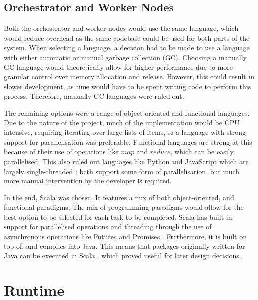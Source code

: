 \subsection{Orchestrator and Worker Nodes}
Both the orchestrator and worker nodes would use the same language, which would reduce overhead as the same codebase could be used for both parts of the system. When selecting a language, a decision had to be made to use a language with either automatic or manual garbage collection (GC). Choosing a manually GC language would theoretically allow for higher  performance due to more granular control over memory allocation and release. However, this could result in slower development, as time would have to be spent writing code to perform this process. Therefore, manually GC languages were ruled out.

The remaining options were a range of object-oriented and functional languages. Due to the nature of the project, much of the implementation would be CPU intensive, requiring iterating over large lists of items, so a language with strong support for parallelisation was preferable. Functional languages are strong at this because of their use of operations like $map$ and $reduce$, which can be easily parallelised. This also ruled out languages like Python  and JavaScript  which are largely single-threaded ; both support some form of parallelisation, but much more manual intervention by the developer is required.

In the end, Scala was chosen. It features a mix of both object-oriented, and functional paradigms, The mix of programming paradigms would allow for the best option to be selected for each task to be completed. Scala has built-in support for parallelised operations and threading through the use of asynchronous operations like Futures and Promises . Furthermore, it is built on top of, and compiles into Java. This means that packages originally written for Java can be executed in Scala , which proved useful for later design decisions.
 
\section{Runtime}
